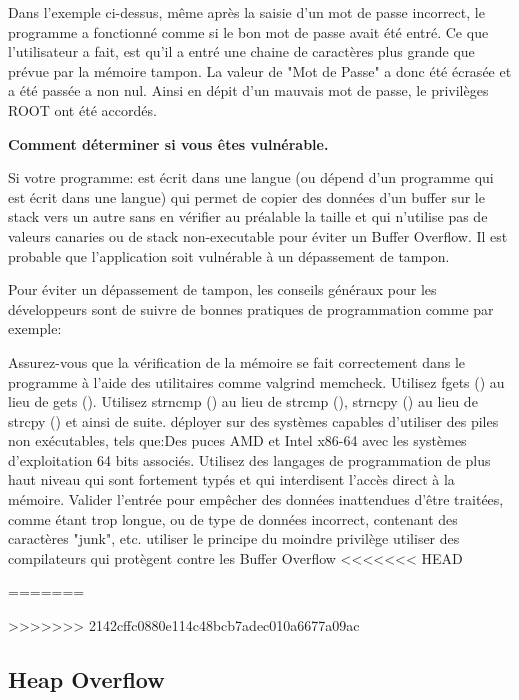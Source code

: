 \begin{flushleft}
Dans l'exemple ci-dessus, même après la saisie d'un mot de passe incorrect, le programme a fonctionné comme si le bon mot de passe avait été entré.
Ce que l'utilisateur a fait, est qu'il a entré une chaine de caractères plus grande que prévue par la mémoire tampon. La valeur de "Mot de Passe" a donc été écrasée et a été passée a non nul. Ainsi en dépit d'un mauvais mot de passe, le privilèges ROOT ont été accordés.
\end{flushleft}

\begin{flushleft}
\textbf{Comment déterminer si vous êtes vulnérable.}
\end{flushleft}

\begin{flushleft}
Si votre programme:
est écrit dans une langue (ou dépend d'un programme qui est écrit dans une langue) qui permet de copier des données d'un buffer sur le stack vers un autre sans en vérifier au préalable la taille et qui n'utilise pas de valeurs canaries ou de stack non-executable pour éviter un Buffer Overflow. Il est probable que l'application soit vulnérable à un dépassement de tampon.
\end{flushleft}

\begin{flushleft}
Pour éviter un dépassement de tampon, les conseils généraux pour les développeurs sont de suivre de bonnes pratiques de programmation comme par exemple: 
\end{flushleft}
\begin{flushleft}
Assurez-vous que la vérification de la mémoire se fait correctement dans le programme à l'aide des utilitaires comme valgrind memcheck.
Utilisez fgets () au lieu de gets ().
Utilisez strncmp () au lieu de strcmp (), strncpy () au lieu de strcpy () et ainsi de suite. déployer sur des systèmes capables d'utiliser des piles non exécutables, tels que:Des puces AMD et Intel x86-64  avec les systèmes d'exploitation 64 bits associés.
Utilisez des langages de programmation de plus haut niveau qui sont fortement typés et qui interdisent l'accès direct à la mémoire.
Valider l'entrée pour empêcher  des données inattendues d'être traitées, comme étant trop longue, ou de type de données incorrect, contenant des caractères "junk", etc.
utiliser le principe du moindre privilège
utiliser des compilateurs qui protègent contre les Buffer Overflow 
<<<<<<< HEAD
\end{flushleft}
=======

>>>>>>> 2142cffc0880e114c48bcb7adec010a6677a09ac

\subsection{Heap Overflow}\label{vulnerabilites:applicatives:buffer-overflow:heap}


